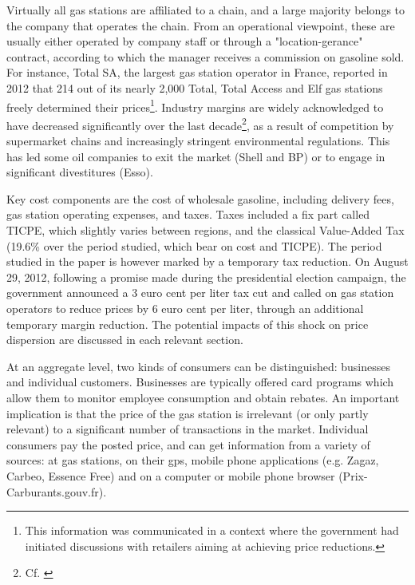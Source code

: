 \documentclass[english]{article}
\begin{document}
Virtually all gas stations are affiliated to a chain, and a large majority belongs to the company that operates the chain. From an operational viewpoint, these are usually  either operated by company staff or through a "location-gerance" contract, according to which the manager receives a commission on gasoline sold. For instance, Total SA, the largest gas station operator in France, reported in 2012 that 214 out of its nearly 2,000 Total, Total Access and Elf gas stations freely determined their prices\footnote{This information was communicated in a context where the government had initiated discussions with retailers aiming at achieving price reductions.}. Industry margins are widely acknowledged to have decreased significantly over the last decade\footnote{Cf. \cite{BEL12}}, as a result of competition by supermarket chains and increasingly stringent environmental regulations. This has led some oil companies to exit the market (Shell and BP) or to engage in significant divestitures (Esso).

Key cost components are the cost of wholesale gasoline, including delivery fees,  gas station operating expenses, and taxes. Taxes included a fix part called TICPE, which slightly varies between regions, and the classical Value-Added Tax (19.6\% over the period studied, which bear on cost and TICPE). The period studied in the paper is however marked by a temporary tax reduction. On August 29, 2012, following a promise made during the presidential election campaign, the government announced a 3 euro cent per liter tax cut and called on gas station operators to reduce prices by 6 euro cent per liter, through an additional temporary margin reduction. The potential impacts of this shock on price dispersion are discussed in each relevant section.

At an aggregate level, two kinds of consumers can be distinguished: businesses and individual customers. Businesses are typically offered card programs which allow them to monitor employee consumption and obtain rebates. An important implication is that the price of the gas station is irrelevant (or only partly relevant) to a significant number of transactions in the market. Individual consumers pay the posted price, and can get information from a variety of sources: at gas stations, on their gps, mobile phone applications (e.g. Zagaz, Carbeo, Essence Free) and on a computer or mobile phone browser (Prix-Carburants.gouv.fr).
\end{document}
